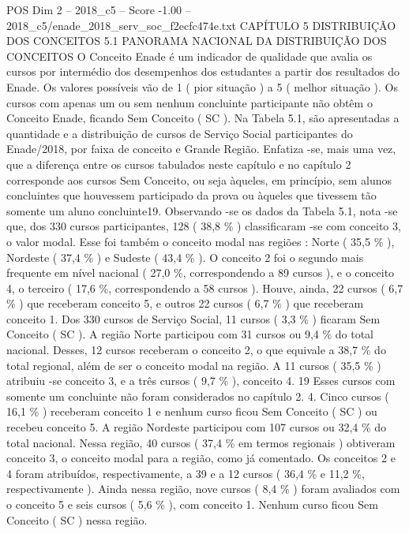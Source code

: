\begin{textsample}{POS Dim 2 – 2018\_c5 – Score -1.00 – 2018\_c5/enade\_2018\_serv\_soc\_f2ecfc474e.txt}  \label{ex:f2_pos_316}
CAPÍTULO 5 DISTRIBUIÇÃO DOS CONCEITOS 5.1 PANORAMA NACIONAL DA DISTRIBUIÇÃO DOS CONCEITOS O Conceito Enade é um indicador de qualidade que avalia os cursos por intermédio dos desempenhos dos estudantes a partir dos resultados do Enade.
Os valores possíveis vão de 1 ( pior situação ) a 5 ( melhor situação ).
Os cursos com apenas um ou sem nenhum concluinte participante não obtêm o Conceito Enade, ficando Sem Conceito ( SC ).
Na Tabela 5.1, são apresentadas a quantidade e a distribuição de cursos de Serviço Social participantes do Enade/2018, por faixa de conceito e Grande Região.
Enfatiza -se, mais uma vez, que a diferença entre os cursos tabulados neste capítulo e no capítulo 2 corresponde aos cursos Sem Conceito, ou seja àqueles, em princípio, sem alunos concluintes que houvessem participado da prova ou àqueles que tivessem tão somente um aluno concluinte19.
Observando -se os dados da Tabela 5.1, nota -se que, dos 330 cursos participantes, 128 ( 38,8 \% ) classificaram -se com conceito 3, o valor modal.
Esse foi também o conceito modal nas regiões : Norte ( 35,5 \% ), Nordeste ( 37,4 \% ) e Sudeste ( 43,4 \% ).
O conceito 2 foi o segundo mais frequente em nível nacional ( 27,0 \%, correspondendo a 89 cursos ), e o conceito 4, o terceiro ( 17,6 \%, correspondendo a 58 cursos ).
Houve, ainda, 22 cursos ( 6,7 \% ) que receberam conceito 5, e outros 22 cursos ( 6,7 \% ) que receberam conceito 1.
Dos 330 cursos de Serviço Social, 11 cursos ( 3,3 \% ) ficaram Sem Conceito ( SC ).
A região Norte participou com 31 cursos ou 9,4 \% do total nacional.
Desses, 12 cursos receberam o conceito 2, o que equivale a 38,7 \% do total regional, além de ser o conceito modal na região.
A 11 cursos ( 35,5 \% ) atribuiu -se conceito 3, e a três cursos ( 9,7 \% ), conceito 4. 19 Esses cursos com somente um concluinte não foram considerados no capítulo 2. 4.
Cinco cursos ( 16,1 \% ) receberam conceito 1 e nenhum curso ficou Sem Conceito ( SC ) ou recebeu conceito 5.
A região Nordeste participou com 107 cursos ou 32,4 \% do total nacional.
Nessa região, 40 cursos ( 37,4 \% em termos regionais ) obtiveram conceito 3, o conceito modal para a região, como já comentado.
Os conceitos 2 e 4 foram atribuídos, respectivamente, a 39 e a 12 cursos ( 36,4 \% e 11,2 \%, respectivamente ).
Ainda nessa região, nove cursos ( 8,4 \% ) foram avaliados com o conceito 5 e seis cursos ( 5,6 \% ), com conceito 1.
Nenhum curso ficou Sem Conceito ( SC ) nessa região.

\end{textsample}
